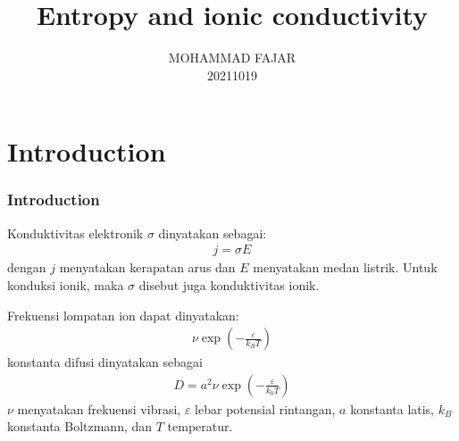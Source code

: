 \documentclass[t]{beamer}
\title{Entropy and ionic conductivity}
\author{MOHAMMAD FAJAR\\
20211019}
\begin{document}
\setlength \belowdisplayskip{2 pt} 
\setlength \abovedisplayskip{2 pt}
\begin{frame}
\maketitle
\end{frame}

\section{Introduction}
\begin{frame}
\frametitle{Introduction}
Konduktivitas elektronik $\sigma$ dinyatakan sebagai:
\begin{align}
j = \sigma E \label{pers .1}
\end{align}
dengan $j$ menyatakan kerapatan arus dan $E$ menyatakan medan listrik. Untuk konduksi ionik, maka $\sigma$ disebut juga konduktivitas ionik. 

Frekuensi lompatan ion dapat dinyatakan:
\begin{align}
\nu \exp \left( - \frac{\varepsilon}{k_B T} \right)
\end{align}
konstanta difusi dinyatakan sebagai 
\begin{align}
D = a^2 \nu  \exp \left( - \frac{\varepsilon}{k_b T}\right)
\end{align}
  $\nu$ menyatakan frekuensi vibrasi, $\varepsilon$ lebar potensial rintangan, $a$ konstanta latis, $k_B$ konstanta Boltzmann, dan $T$ temperatur. 
 
 \end{frame}
 
\end{document}
